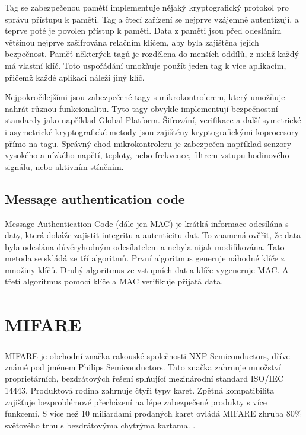 \par
Tag se zabezpečenou pamětí implementuje nějaký kryptografický protokol pro správu přístupu k paměti. Tag a čtecí zařízení se nejprve vzájemně autentizují, a teprve poté je povolen přístup k paměti. Data z paměti jsou před odesláním většinou nejprve zašifrována relačním klíčem, aby byla zajištěna jejich bezpečnost. Paměť některých tagů je rozdělena do menších oddílů, z nichž každý má vlastní klíč. Toto uspořádání umožňuje použít jeden tag k více aplikacím, přičemž každé aplikaci náleží jiný klíč.
\par
Nejpokročilejšími jsou zabezpečené tagy s mikrokontrolerem, který umožňuje nahrát různou funkcionalitu. Tyto tagy obvykle implementují bezpečnostní standardy jako například Global Platform. Šifrování, verifikace a další symetrické i asymetrické kryptografické metody jsou zajištěny kryptografickými koprocesory přímo na tagu\cite{Mifare_Classic_story}. Správný chod mikrokontroleru je zabezpečen například senzory vysokého a nízkého napětí, teploty, nebo frekvence, filtrem vstupu hodinového signálu, nebo aktivním stíněním\cite{NXP_Microcontroller_overview}.

\subsection{Message authentication code}
Message Authentication Code (dále jen MAC) je krátká informace odesílána s daty, která dokáže zajistit integritu a autenticitu dat. To znamená ověřit, že data byla odeslána důvěryhodným odesílatelem a nebyla nijak modifikována. Tato metoda se skládá ze tří algoritmů. První algoritmus generuje náhodné klíče z množiny klíčů. Druhý algoritmus ze vstupních dat a klíče vygeneruje MAC. A třetí algoritmus pomocí klíče a MAC verifikuje přijatá data\cite{Foundations_Of_Cryptography}.
\par

\section{MIFARE\textsuperscript{\textregistered}}
MIFARE\textsuperscript{\textregistered} je obchodní značka rakouské společnosti NXP Semiconductors, dříve známé pod jménem Philips Semiconductors. Tato značka zahrnuje množství proprietárních, bezdrátových řešení splňující mezinárodní standard ISO/IEC 14443. Produktová rodina zahrnuje čtyři typy karet. Zpětná kompatibilita zajišťuje bezproblémové přecházení na lépe zabezpečené produkty s více funkcemi. S více než 10 miliardami prodaných karet ovládá MIFARE zhruba 80\% světového trhu s bezdrátovýma chytrýma kartama. 
\cite{About_MIFARE}\cite{Dismantling_Mifare_Classic}.

